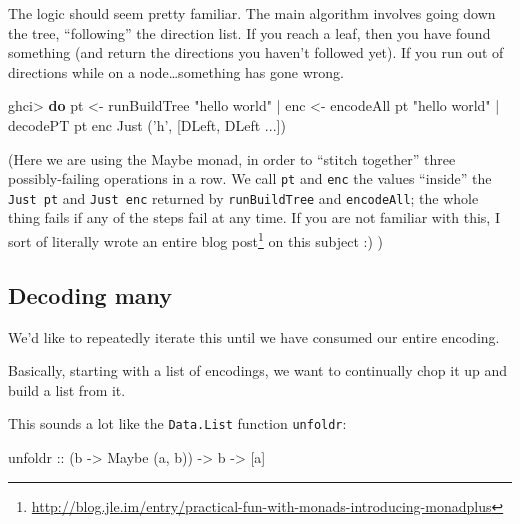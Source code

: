 \documentclass[]{article}
\newenvironment{Shaded}{}{}
\newcommand{\KeywordTok}[1]{\textcolor[rgb]{0.00,0.44,0.13}{\textbf{{#1}}}}
\newcommand{\DataTypeTok}[1]{\textcolor[rgb]{0.56,0.13,0.00}{{#1}}}
\newcommand{\CharTok}[1]{\textcolor[rgb]{0.25,0.44,0.63}{{#1}}}
\newcommand{\StringTok}[1]{\textcolor[rgb]{0.25,0.44,0.63}{{#1}}}
\newcommand{\OtherTok}[1]{\textcolor[rgb]{0.00,0.44,0.13}{{#1}}}
\newcommand{\FunctionTok}[1]{\textcolor[rgb]{0.02,0.16,0.49}{{#1}}}
\newcommand{\NormalTok}[1]{{#1}}
\renewcommand{\href}[2]{#2\footnote{\url{#1}}}
\begin{document}
The logic should seem pretty familiar. The main algorithm involves going
down the tree, ``following'' the direction list. If you reach a leaf,
then you have found something (and return the directions you haven't
followed yet). If you run out of directions while on a
node\ldots{}something has gone wrong.

\begin{Shaded}
\begin{Highlighting}[]
\NormalTok{ghci}\FunctionTok{>} \KeywordTok{do}  \NormalTok{pt  }\OtherTok{<-} \NormalTok{runBuildTree }\StringTok{"hello world"}
    \FunctionTok{|}     \NormalTok{enc }\OtherTok{<-} \NormalTok{encodeAll pt }\StringTok{"hello world"}
    \FunctionTok{|}     \NormalTok{decodePT pt enc}
\DataTypeTok{Just} \NormalTok{(}\CharTok{'h'}\NormalTok{, [}\DataTypeTok{DLeft}\NormalTok{, }\DataTypeTok{DLeft} \FunctionTok{...}\NormalTok{])}
\end{Highlighting}
\end{Shaded}

(Here we are using the Maybe monad, in order to ``stitch together''
three possibly-failing operations in a row. We call \texttt{pt} and
\texttt{enc} the values ``inside'' the \texttt{Just\ pt} and
\texttt{Just\ enc} returned by \texttt{runBuildTree} and
\texttt{encodeAll}; the whole thing fails if any of the steps fail at
any time. If you are not familiar with this,
\href{http://blog.jle.im/entry/practical-fun-with-monads-introducing-monadplus}{I
sort of literally wrote an entire blog post} on this subject :) )

\subsection{Decoding many}\label{decoding-many}

We'd like to repeatedly iterate this until we have consumed our entire
encoding.

Basically, starting with a list of encodings, we want to continually
chop it up and build a list from it.

This sounds a lot like the \texttt{Data.List} function \texttt{unfoldr}:

\begin{Shaded}
\begin{Highlighting}[]
\OtherTok{unfoldr ::} \NormalTok{(b }\OtherTok{->} \DataTypeTok{Maybe} \NormalTok{(a, b)) }\OtherTok{->} \NormalTok{b }\OtherTok{->} \NormalTok{[a]}
\end{Highlighting}
\end{Shaded}
\end{document}
